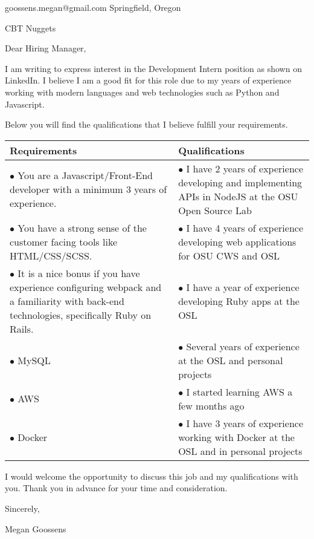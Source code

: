 \documentclass[11pt]{article} %
\begin{document}
        {goossens.megan@gmail.com}
        {Springfield, Oregon}

          {CBT Nuggets}

Dear Hiring Manager,

I am writing to express interest in the {Development Intern} position
as shown on {LinkedIn}. I believe I am a good fit for this role due to my years
of experience {working with modern languages and web technologies such as Python
and Javascript.}

Below you will find the qualifications that I believe fulfill your requirements.

\begin{table}[h!]
  \begin{center}
    \begin{tabular}{p{9cm}|p{9cm}} %
      \textbf{Requirements} & \textbf{Qualifications} \\
      \hline
      $\bullet$ You are a Javascript/Front-End developer with a minimum 3 years
      of experience.& $\bullet$ I have 2 years of experience developing and implementing APIs in NodeJS at the OSU Open Source Lab\\
      $\bullet$ You have a strong sense of the customer facing tools like
      HTML/CSS/SCSS. & $\bullet$ I have 4 years of experience developing web
      applications for OSU CWS and OSL\\
      $\bullet$ It is a nice bonus if you have experience configuring webpack
      and a familiarity with back-end technologies, specifically Ruby on Rails.
      & $\bullet$ I have a year of experience developing Ruby apps at the OSL\\
      $\bullet$ MySQL & $\bullet$ Several years of experience at the OSL and
      personal projects\\
      $\bullet$ AWS & $\bullet$ I started learning AWS a few months ago\\
      $\bullet$ Docker & $\bullet$ I have 3 years of experience working with
      Docker at the OSL and in personal projects\\
    \end{tabular}
  \end{center}
\end{table}

I would welcome the opportunity to discuss this job and my qualifications with
you. Thank you in advance for your time and consideration.

Sincerely,

Megan Goossens
\end{document}
